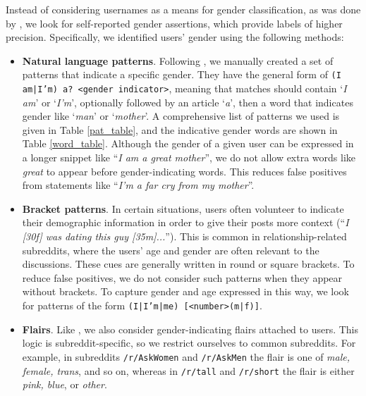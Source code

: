 Instead of considering usernames as a means for gender classification, as was done by \citet{thelwall2018she}, we look for self-reported gender assertions, which provide labels of higher precision.
Specifically, we identified 
users' gender
using the following methods:
\begin{itemize}
    \item \textbf{Natural language patterns}.
    Following \citet{fabian2015privacy}, we manually created a set of patterns that indicate a specific gender. They have the general form of \texttt{\small (I am|I'm) a? <gender indicator>}, meaning that matches should contain `\textit{I am}' or `\textit{I'm}', optionally followed by an article `\textit{a}', then a word that indicates gender like `\textit{man}' or `\textit{mother}'. A comprehensive list of patterns we used is given in Table \ref{pat_table}, and the indicative gender words are shown in Table \ref{word_table}. Although the gender of a given user can be expressed in a longer snippet like ``\textit{I am a great mother}'', we do not allow extra words like \textit{great} to appear before gender-indicating words. This reduces false positives from statements like ``\textit{I'm a far cry from my mother}''.
    
    \item \textbf{Bracket patterns}.
    In certain situations, users often volunteer to indicate their demographic information in order to give their posts more context (``\textit{I [30f] was dating this guy [35m]...}'').
    This is common in relationship-related subreddits, where the users' age and gender are often relevant to the discussions. These cues are generally written in round or square brackets. To reduce false positives, we do not consider such patterns when they appear without brackets. To capture gender and age expressed in this way, we look for patterns of the form \texttt{\small (I|I'm|me) [<number>(m|f)]}.
    
    \item \textbf{Flairs}.
    Like \citet{Vasilev2018}, we also consider gender-indicating flairs attached to users.
    This logic is subreddit-specific, so we restrict ourselves to common subreddits.
    For example, in subreddits \texttt{\small /r/AskWomen} and \texttt{\small /r/AskMen} the flair is one of \textit{male, female, trans}, and so on, whereas in \texttt{\small /r/tall} and \texttt{\small /r/short} the flair is either \textit{pink, blue}, or \textit{other}.

\end{itemize}

